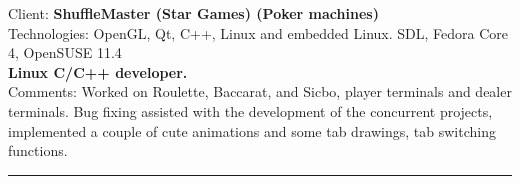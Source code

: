 \documentclass{article}
\begin{document}




%



Client: 	\textbf  {ShuffleMaster  (Star Games)   (Poker machines) } \\
Technologies: 	OpenGL, Qt, C++, Linux and embedded Linux. SDL, Fedora Core 4, OpenSUSE 11.4 \\
\textbf{ Linux C/C++ developer. } \\
Comments:	Worked on Roulette, Baccarat, and Sicbo, player terminals and 
		dealer terminals.  Bug fixing assisted with the development of the concurrent
		projects, implemented a couple of cute animations and some tab drawings,
		tab switching functions. \\


\noindent\hfil\rule{0.5\textwidth}{.4pt}\hfil
\\

\end{document}
